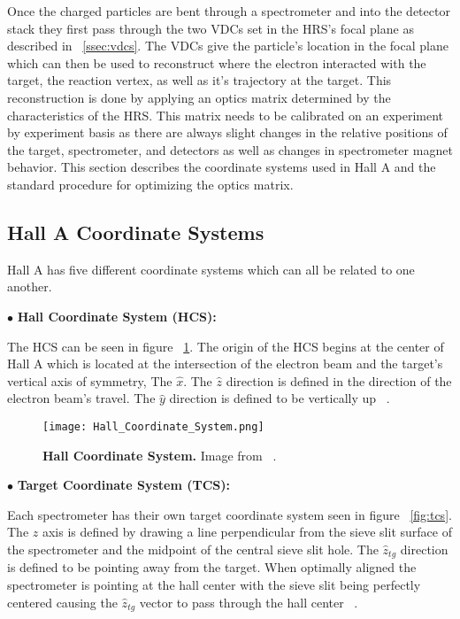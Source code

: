 Once the charged particles are bent through a spectrometer and into the detector stack they first pass through the two VDCs set in the HRS's focal plane as described in ~\ref{ssec:vdcs}. The VDCs give the particle's location in the focal plane which can then be used to reconstruct where the electron interacted with the target, the reaction vertex, as well as it's trajectory at the target. This reconstruction is done by applying an optics matrix determined by the characteristics of the HRS. This matrix needs to be calibrated on an experiment by experiment basis as there are always slight changes in the relative positions of the target, spectrometer, and detectors as well as changes in spectrometer magnet behavior. This section describes the coordinate systems used in Hall A and the standard procedure for optimizing the optics matrix. 

\subsection{Hall A Coordinate Systems}
\label{ssec:coordinates}

Hall A has five different coordinate systems which can all be related to one another. 

\noindent $\bullet$ \textbf{Hall Coordinate System (HCS):}

The HCS can be seen in figure ~\ref{fig:hcs}. The origin of the HCS begins at the center of Hall A which is located at the intersection of the electron beam and the target's vertical axis of symmetry, The $\hat{x}$. The $\hat{z}$ direction is defined in the direction of the electron beam's travel. The $\hat{y}$ direction is defined to be vertically up ~\cite{optics}.

\begin{figure}[!ht]
\begin{center}
\texttt{[image: Hall\_Coordinate\_System.png]}
\end{center}
\caption{
{\bf{Hall Coordinate System.}} Image from ~\cite{optics}.}
\label{fig:hcs}
\end{figure}

\noindent $\bullet$ \textbf{Target Coordinate System (TCS):}

Each spectrometer has their own target coordinate system seen in figure ~\ref{fig:tcs}. The $z$ axis is defined by drawing a line perpendicular from the sieve slit surface of the spectrometer and the midpoint of the central sieve slit hole. The $\hat{z}_{tg}$ direction is defined to be pointing away from the target. When optimally aligned the spectrometer is pointing at the hall center with the sieve slit being perfectly centered causing the $\hat{z}_{tg}$ vector to pass through the hall center ~\cite{optics}. 

